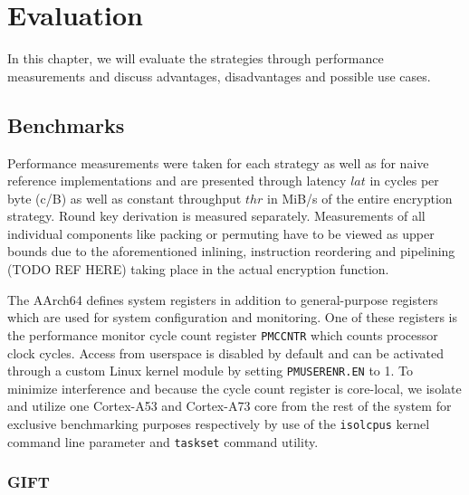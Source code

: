 \chapter{Evaluation}

In this chapter, we will evaluate the strategies through performance
measurements and discuss advantages, disadvantages and possible use cases.

\section{Benchmarks}

Performance measurements were taken for each strategy as well as for naive
reference implementations and are presented through latency $lat$ in cycles per
byte (c/B) as well as constant throughput $thr$ in MiB/s of the entire
encryption strategy. Round key derivation is measured separately. Measurements
of all individual components like packing or permuting have to be viewed as
upper bounds due to the aforementioned inlining, instruction reordering and
pipelining (TODO REF HERE) taking place in the actual encryption function.

The AArch64 defines system registers in addition to general-purpose registers
which are used for system configuration and monitoring. One of these registers
is the performance monitor cycle count register \texttt{PMCCNTR} which counts
processor clock cycles. Access from userspace is disabled by default and can be
activated through a custom Linux kernel module by setting \texttt{PMUSERENR.EN}
to 1. To minimize interference and because the cycle count register is
core-local, we isolate and utilize one Cortex-A53 and Cortex-A73 core from the
rest of the system for exclusive benchmarking purposes respectively by use of
the \texttt{isolcpus} kernel command line parameter and \texttt{taskset}
command utility.

\subsection{GIFT}

